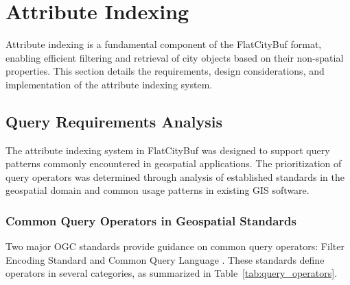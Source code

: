 
\section{Attribute Indexing}
\label{methodology:attribute_index}

Attribute indexing is a fundamental component of the FlatCityBuf format, enabling efficient filtering and retrieval of city objects based on their non-spatial properties. This section details the requirements, design considerations, and implementation of the attribute indexing system.

\subsection{Query Requirements Analysis}
\label{methodology:attribute_index:query_requirements}

The attribute indexing system in FlatCityBuf was designed to support query patterns commonly encountered in geospatial applications. The prioritization of query operators was determined through analysis of established standards in the geospatial domain and common usage patterns in existing GIS software.

\subsubsection{Common Query Operators in Geospatial Standards}
\label{methodology:attribute_index:query_requirements:standards}

Two major OGC standards provide guidance on common query operators: Filter Encoding Standard \citep{ogc_filter_encoding_2010} and Common Query Language \citep{ogc_cql2_2024}. These standards define operators in several categories, as summarized in Table~\ref{tab:query_operators}.

